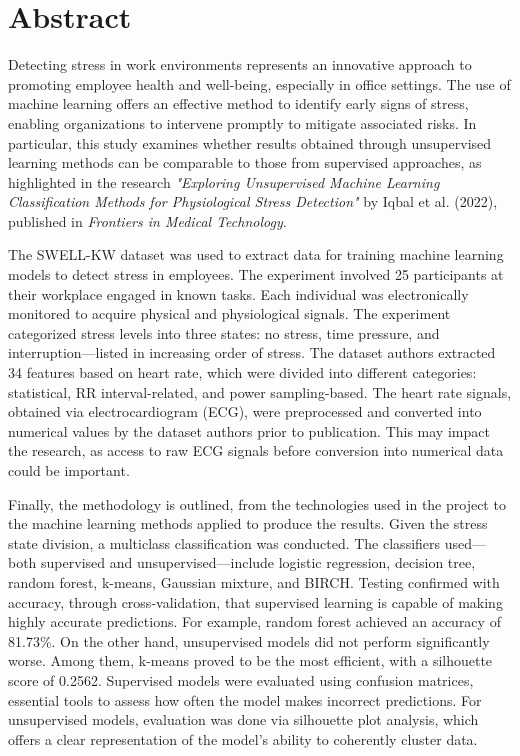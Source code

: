 \chapter*{Abstract}

Detecting stress in work environments represents an innovative approach to promoting employee health and well-being, especially in office settings. The use of machine learning offers an effective method to identify early signs of stress, enabling organizations to intervene promptly to mitigate associated risks. In particular, this study examines whether results obtained through unsupervised learning methods can be comparable to those from supervised approaches, as highlighted in the research \textit{"Exploring Unsupervised Machine Learning Classification Methods for Physiological Stress Detection"} by Iqbal et al. (2022), published in \textit{Frontiers in Medical Technology}.

\vspace{0.5cm}

The SWELL-KW dataset was used to extract data for training machine learning models to detect stress in employees. The experiment involved 25 participants at their workplace engaged in known tasks. Each individual was electronically monitored to acquire physical and physiological signals. The experiment categorized stress levels into three states: no stress, time pressure, and interruption—listed in increasing order of stress. The dataset authors extracted 34 features based on heart rate, which were divided into different categories: statistical, RR interval-related, and power sampling-based. The heart rate signals, obtained via electrocardiogram (ECG), were preprocessed and converted into numerical values by the dataset authors prior to publication. This may impact the research, as access to raw ECG signals before conversion into numerical data could be important.

\vspace{0.5cm}

Finally, the methodology is outlined, from the technologies used in the project to the machine learning methods applied to produce the results. Given the stress state division, a multiclass classification was conducted. The classifiers used—both supervised and unsupervised—include logistic regression, decision tree, random forest, k-means, Gaussian mixture, and BIRCH. Testing confirmed with accuracy, through cross-validation, that supervised learning is capable of making highly accurate predictions. For example, random forest achieved an accuracy of 81.73\%. On the other hand, unsupervised models did not perform significantly worse. Among them, k-means proved to be the most efficient, with a silhouette score of 0.2562. Supervised models were evaluated using confusion matrices, essential tools to assess how often the model makes incorrect predictions. For unsupervised models, evaluation was done via silhouette plot analysis, which offers a clear representation of the model’s ability to coherently cluster data.

